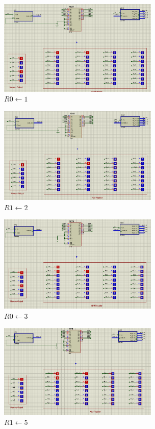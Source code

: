 \documentclass[12pt,onecolumn,a4paper,fleqn]{article}
\begin{document}
 \begin{figure}[H]
  	 							\centering
  	 							\includegraphics[width=0.68\textwidth]{source/13.png}
  	 							\caption{$R0 \leftarrow 1$}
  	 							\label{fig:13}
 \end{figure}
 \begin{figure}[H]
   	 							\centering
   	 							\includegraphics[width=0.68\textwidth]{source/14.png}
   	 							\caption{$R1 \leftarrow 2$}
   	 							\label{fig:14}
  \end{figure}
  \begin{figure}[H]
    	 							\centering
    	 							\includegraphics[width=0.68\textwidth]{source/15.png}
    	 							\caption{$R0 \leftarrow 3$}
    	 							\label{fig:15}
   \end{figure}
   \begin{figure}[H]
     	 							\centering
     	 							\includegraphics[width=0.68\textwidth]{source/16.png}
     	 							\caption{$R1 \leftarrow 5$}
     	 							\label{fig:16}
    \end{figure}
\end{document}
